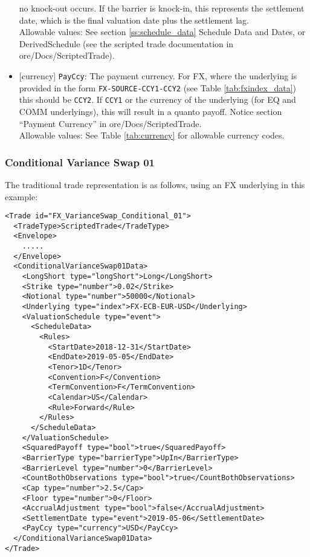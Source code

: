 \begin{itemize}
  no knock-out occurs. If the barrier is knock-in, this represents the settlement date, which is the final
  valuation date plus the settlement lag. \\
  Allowable values: See section \ref{ss:schedule_data} Schedule Data and Dates, or DerivedSchedule (see the scripted trade documentation in ore/Docs/ScriptedTrade).
  \item{}[currency] \lstinline!PayCcy!: The payment currency. For FX, where the underlying is provided
      in the form \lstinline!FX-SOURCE-CCY1-CCY2! (see Table \ref{tab:fxindex_data}) this should
      be \lstinline!CCY2!. If \lstinline!CCY1! or the currency of the underlying (for EQ and
      COMM underlyings), this will result in a quanto payoff. Notice section ``Payment Currency'' in ore/Docs/ScriptedTrade. \\
        Allowable values: See Table \ref{tab:currency}  for allowable currency codes.
\end{itemize}

\subsubsection*{Conditional Variance Swap 01}

The traditional trade representation is as follows, using an FX underlying in this example:

\begin{verbatim}
<Trade id="FX_VarianceSwap_Conditional_01">
  <TradeType>ScriptedTrade</TradeType>
  <Envelope>
    .....
  </Envelope>
  <ConditionalVarianceSwap01Data>
    <LongShort type="longShort">Long</LongShort>
    <Strike type="number">0.02</Strike>
    <Notional type="number">50000</Notional>
    <Underlying type="index">FX-ECB-EUR-USD</Underlying>
    <ValuationSchedule type="event">
      <ScheduleData>
        <Rules>
          <StartDate>2018-12-31</StartDate>
          <EndDate>2019-05-05</EndDate>
          <Tenor>1D</Tenor>
          <Convention>F</Convention>
          <TermConvention>F</TermConvention>
          <Calendar>US</Calendar>
          <Rule>Forward</Rule>
        </Rules>
      </ScheduleData>
    </ValuationSchedule>
    <SquaredPayoff type="bool">true</SquaredPayoff>
    <BarrierType type="barrierType">UpIn</BarrierType>
    <BarrierLevel type="number">0</BarrierLevel>
    <CountBothObservations type="bool">true</CountBothObservations>
    <Cap type="number">2.5</Cap>
    <Floor type="number">0</Floor>
    <AccrualAdjustment type="bool">false</AccrualAdjustment>
    <SettlementDate type="event">2019-05-06</SettlementDate>
    <PayCcy type="currency">USD</PayCcy>
  </ConditionalVarianceSwap01Data>
</Trade>
\end{verbatim}

